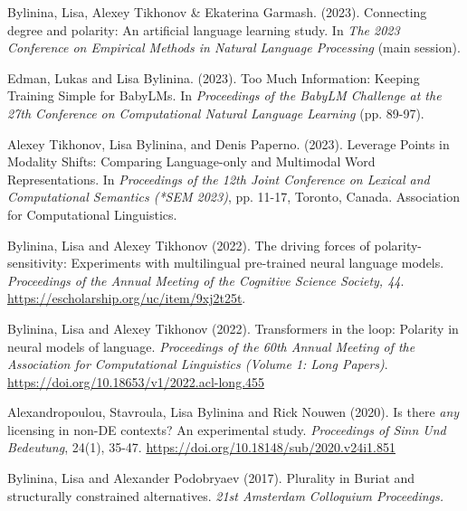 \documentclass[12pt,letterpaper]{article}
\begin{document}
\small{
\begin{hangparas}{.25in}{1} 

Bylinina, Lisa, Alexey Tikhonov \& Ekaterina Garmash. (2023). Connecting degree and polarity: An artificial language learning study. In {\it The 2023 Conference on Empirical Methods in Natural Language Processing} (main session).
\vspace{1mm} 

Edman, Lukas and Lisa Bylinina. (2023). Too Much Information: Keeping Training Simple for BabyLMs. In {\it Proceedings of the BabyLM Challenge at the 27th Conference on Computational Natural Language Learning} (pp. 89-97).

\vspace{1mm} 

Alexey Tikhonov, Lisa Bylinina, and Denis Paperno. (2023). Leverage Points in Modality Shifts: Comparing Language-only and Multimodal Word Representations. In {\it Proceedings of the 12th Joint Conference on Lexical and Computational Semantics (*SEM 2023)}, pp. 11-17, Toronto, Canada. Association for Computational Linguistics.

\vspace{1mm} 

Bylinina, Lisa and Alexey Tikhonov (2022). The driving forces of polarity-sensitivity: Experiments with multilingual pre-trained neural language models. {\it Proceedings of the Annual Meeting of the Cognitive Science Society, 44}. \url{https://escholarship.org/uc/item/9xj2t25t}.

\vspace{1mm} 

Bylinina, Lisa and Alexey Tikhonov (2022). Transformers in the loop: Polarity in neural models of language. {\it Proceedings of the 60th Annual Meeting of the Association for Computational Linguistics (Volume 1: Long Papers)}. \url{https://doi.org/10.18653/v1/2022.acl-long.455}
 
\vspace{1mm} 

Alexandropoulou, Stavroula, Lisa Bylinina and Rick Nouwen (2020). Is there {\it any} licensing in non-DE contexts? An experimental study. {\it Proceedings of Sinn Und Bedeutung}, 24(1), 35-47. \url{https://doi.org/10.18148/sub/2020.v24i1.851}

\vspace{1mm} 

Bylinina, Lisa and Alexander Podobryaev (2017). Plurality in Buriat and structurally constrained alternatives. {\it 21st Amsterdam Colloquium Proceedings.}


\end{hangparas}}
\end{document}
